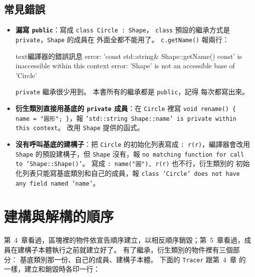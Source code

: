 \subsection{常見錯誤}

\begin{itemize}
\item \textbf{漏寫 \texttt{public}}：寫成 \texttt{class Circle : Shape}，
\texttt{class} 預設的繼承方式是 \texttt{private}，\texttt{Shape} 的成員在
外面全都不能用了。 \texttt{c.getName()} 報兩行：
\begin{code}{text}{編譯器的錯誤訊息}
error: 'const std::string& Shape::getName() const' is inaccessible within this context
error: 'Shape' is not an accessible base of 'Circle'
\end{code}
\texttt{private} 繼承很少用到。 本書所有的繼承都是 \texttt{public}，記得
每次都寫出來。
\item \textbf{衍生類別直接用基底的 \texttt{private} 成員}：在
\texttt{Circle} 裡寫 \texttt{void rename() \{ name = "圓形"; \}}，報
\texttt{'std::string Shape::name' is private within this context}。 改用
\texttt{Shape} 提供的函式。
\item \textbf{沒有呼叫基底的建構子}：把 \texttt{Circle} 的初始化列表寫成
\texttt{: r(r)}，編譯器會改用 \texttt{Shape} 的預設建構子，但
\texttt{Shape} 沒有，報 \texttt{no matching function for call to
'Shape::Shape()'}。 寫成 \texttt{: name("圓"), r(r)} 也不行，衍生類別的
初始化列表只能寫基底類別和自己的成員，報
\texttt{class 'Circle' does not have any field named 'name'}。
\end{itemize}

\section{建構與解構的順序}
\label{sec:inherit-order}

第~4~章看過，區塊裡的物件依宣告順序建立，以相反順序銷毀；第~5~章看過，成
員在建構子本體執行之前就建立好了。 有了繼承，衍生類別的物件裡有三個部分：
基底類別那一份、自己的成員、建構子本體。 下面的 \texttt{Tracer} 跟第~4~章
的一樣，建立和銷毀時各印一行：

